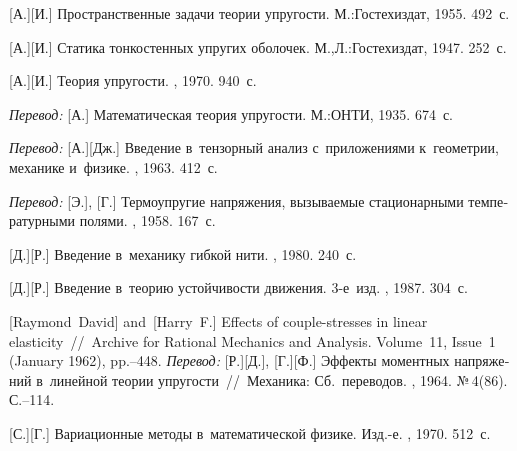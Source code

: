 \begin{thebibliography}{123}
\begin{otherlanguage}{russian}
[А.][И.] Пространственные задачи теории упругости. М.:\;Гос\-тех\-издат, 1955. 492~с.

[А.][И.] Статика тонкостенных упругих оболочек. М.,\:Л.:\;Гос\-тех\-издат, 1947. 252~с.

[А.][И.] Теория упругости. \naukapublisher, 1970. 940~с.

\emph{Перевод:} [А.] Математическая теория упругости. М.:\;ОНТИ, 1935. 674~с.

\emph{Перевод:} [А.][Дж.] Введение в~тензорный анализ с~приложениями к~геометрии, механике и~физике. \fizmatgiz, 1963. 412~с.

\emph{Перевод:} [Э.], [Г.] Термоупругие напряжения, вызываемые стационарными температурными полями. \fizmatgiz, 1958. 167~с.

[Д.][Р.] Введение в~механику гибкой нити. \naukapublisher, 1980. 240~с.

[Д.][Р.] Введение в~теорию устойчивости движения. 3\hbox{-}е~изд. \naukapublisher, 1987. 304~с.

[Raymond~David] %
and~[Harry~F.] %
Effects of couple-stresses in linear elasticity~//~Archive for Rational Mechanics and Analysis. Volume~11, Issue~1 (January 1962), pp.\hbox{--}448.
\emph{Перевод:}
[Р.][Д.], [Г.][Ф.]
Эффекты моментных напряжений в~линейной теории упругости~//~Механика: Сб.~переводов. \mirpublisher, 1964. №\,4\:(86). С.\hbox{--}114.

[С.][Г.] Вариационные методы в~математической физике. Изд.\hbox{-}е. \naukapublisher, 1970. 512~с.


\end{otherlanguage}
\end{thebibliography}
